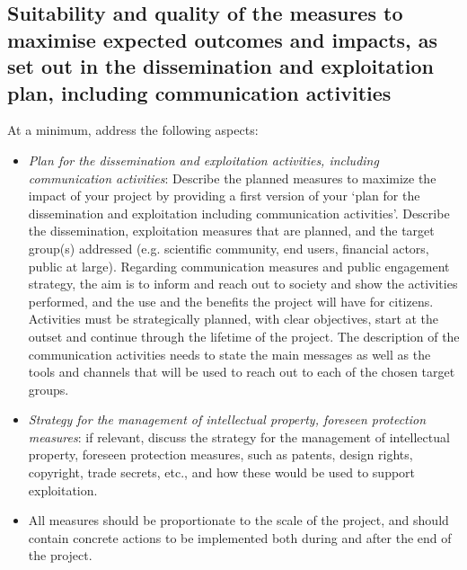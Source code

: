 \documentclass[11pt,draftproposal]{msca-pf}
\begin{document}
\subsection{Suitability and quality of the measures to maximise expected
outcomes and impacts, as set out in the dissemination and exploitation plan,
including communication activities}

At a minimum, address the following aspects:

\begin{itemize}
    \item \emph{Plan for the dissemination and exploitation activities, including
    communication activities}\footnotemark{}: Describe the planned measures to
    maximize the impact of your project by providing a first version of your ‘plan
    for the dissemination and exploitation including communication activities’.
    Describe the dissemination, exploitation measures that are planned, and the target
    group(s) addressed (e.g. scientific community, end users, financial actors,
    public at large). Regarding communication measures and public engagement
    strategy, the aim is to inform and reach out to society and show the activities
    performed, and the use and the benefits the project will have for citizens.
    Activities must be strategically planned, with clear objectives, start at the
    outset and continue through the lifetime of the project. The description of
    the communication activities needs to state the main messages as well as the
    tools and channels that will be used to reach out to each of the chosen target
    groups.


    \item \emph{Strategy for the management of intellectual property, foreseen
    protection measures}: if relevant, discuss the strategy for the management
    of intellectual property, foreseen protection measures, such as patents,
    design rights, copyright, trade secrets, etc., and how these would be used
    to support exploitation.

    \item All measures should be proportionate to the scale of the project, and
    should contain concrete actions to be implemented both during and after the
    end of the project.
\end{itemize}
\end{document}

